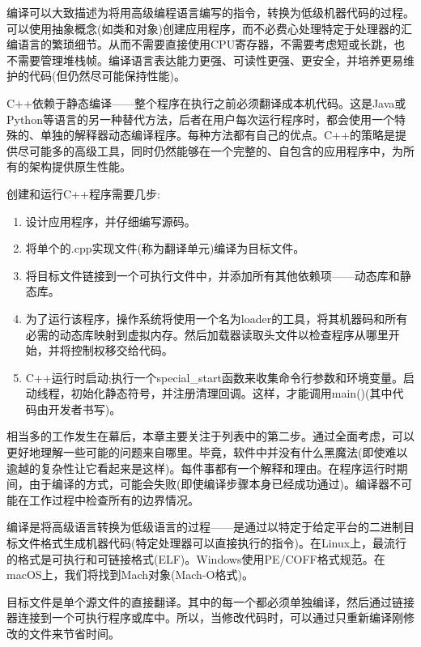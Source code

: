 
编译可以大致描述为将用高级编程语言编写的指令，转换为低级机器代码的过程。可以使用抽象概念(如类和对象)创建应用程序，而不必费心处理特定于处理器的汇编语言的繁琐细节。从而不需要直接使用CPU寄存器，不需要考虑短或长跳，也不需要管理堆栈帧。编译语言表达能力更强、可读性更强、更安全，并培养更易维护的代码(但仍然尽可能保持性能)。

C++依赖于静态编译——整个程序在执行之前必须翻译成本机代码。这是Java或Python等语言的另一种替代方法，后者在用户每次运行程序时，都会使用一个特殊的、单独的解释器动态编译程序。每种方法都有自己的优点。C++的策略是提供尽可能多的高级工具，同时仍然能够在一个完整的、自包含的应用程序中，为所有的架构提供原生性能。

创建和运行C++程序需要几步:

\begin{enumerate}
\item 
设计应用程序，并仔细编写源码。

\item 
将单个的.cpp实现文件(称为翻译单元)编译为目标文件。

\item 
将目标文件链接到一个可执行文件中，并添加所有其他依赖项——动态库和静态库。

\item 
为了运行该程序，操作系统将使用一个名为loader的工具，将其机器码和所有必需的动态库映射到虚拟内存。然后加载器读取头文件以检查程序从哪里开始，并将控制权移交给代码。

\item 
C++运行时启动;执行一个special\_start函数来收集命令行参数和环境变量。启动线程，初始化静态符号，并注册清理回调。这样，才能调用main()(其中代码由开发者书写)。
\end{enumerate}

相当多的工作发生在幕后，本章主要关注于列表中的第二步。通过全面考虑，可以更好地理解一些可能的问题来自哪里。毕竟，软件中并没有什么黑魔法(即使难以逾越的复杂性让它看起来是这样)。每件事都有一个解释和理由。在程序运行时期间，由于编译的方式，可能会失败(即使编译步骤本身已经成功通过)。编译器不可能在工作过程中检查所有的边界情况。


编译是将高级语言转换为低级语言的过程——是通过以特定于给定平台的二进制目标文件格式生成机器代码(特定处理器可以直接执行的指令)。在Linux上，最流行的格式是可执行和可链接格式(ELF)。Windows使用PE/COFF格式规范。在macOS上，我们将找到Mach对象(Mach-O格式)。

目标文件是单个源文件的直接翻译。其中的每一个都必须单独编译，然后通过链接器连接到一个可执行程序或库中。所以，当修改代码时，可以通过只重新编译刚修改的文件来节省时间。

